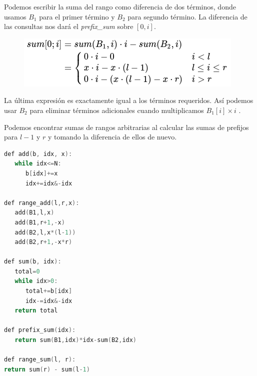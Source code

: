 \begin{enumerate}
Podemos escribir la suma del rango como diferencia de dos términos, donde usamos $B_1$ para el primer término y $B_2$ para segundo término. La diferencia de las consultas nos dará el \emph{prefix\_sum} sobre $[0,i]$.

\begin{figure}[h!]
	\centering
	\includegraphics[width=0.35\linewidth]{img/binary_indexed_tree_2}
	\label{fig:binaryindexedtree2}
\end{figure}

La última expresión es exactamente igual a los términos requeridos. Así podemos usar $B_2$ para eliminar términos adicionales cuando multiplicamos $B_1[i]\times i$ .

Podemos encontrar sumas de rangos arbitrarias al calcular las sumas de prefijos para $l-1$ y $r$ y tomando la diferencia de ellos de nuevo.

\begin{lstlisting}[language=C++]	
def add(b, idx, x):
   while idx<=N:
      b[idx]+=x
      idx+=idx&-idx

def range_add(l,r,x):
   add(B1,l,x)
   add(B1,r+1,-x)
   add(B2,l,x*(l-1))
   add(B2,r+1,-x*r)

def sum(b, idx):
   total=0
   while idx>0:
      total+=b[idx]
      idx-=idx&-idx
   return total

def prefix_sum(idx):
   return sum(B1,idx)*idx-sum(B2,idx)

def range_sum(l, r):
return sum(r) - sum(l-1)
\end{lstlisting}

\end{enumerate}




